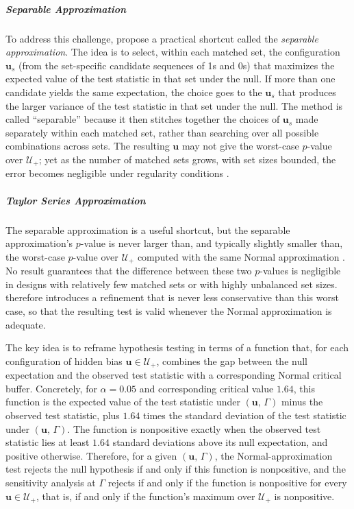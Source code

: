 \documentclass[
  12pt,
  leqno]{article}
\begin{document}
\subparagraph{Separable Approximation}\label{separable-approximation}

To address this challenge, \citet{gastwirthetal2000} propose a practical
shortcut called the \emph{separable approximation}. The idea is to
select, within each matched set, the configuration \(\bm{u}_s\) (from
the set-specific candidate sequences of 1s and 0s) that maximizes the
expected value of the test statistic in that set under the null. If more
than one candidate yields the same expectation, the choice goes to the
\(\bm{u}_s\) that produces the larger variance of the test statistic in
that set under the null. The method is called ``separable'' because it
then stitches together the choices of \(\bm{u}_s\) made separately
within each matched set, rather than searching over all possible
combinations across sets. The resulting \(\bm{u}\) may not give the
worst-case \(p\)-value over \(\mathcal{U}_{+}\); yet as the number of
matched sets grows, with set sizes bounded, the error becomes negligible
under regularity conditions \citep[Proposition 1]{gastwirthetal2000}.

\subparagraph{Taylor Series
Approximation}\label{taylor-series-approximation}

The separable approximation is a useful shortcut, but the separable
approximation's \(p\)-value is never larger than, and typically slightly
smaller than, the worst-case \(p\)-value over \(\mathcal{U}_{+}\)
computed with the same Normal approximation
\citep[pp.~2321--2322]{rosenbaum2018}. No result guarantees that the
difference between these two \(p\)-values is negligible in designs with
relatively few matched sets or with highly unbalanced set sizes.
\citet{rosenbaum2018} therefore introduces a refinement that is never
less conservative than this worst case, so that the resulting test is
valid whenever the Normal approximation is adequate.

The key idea is to reframe hypothesis testing in terms of a function
that, for each configuration of hidden bias
\(\bm{u} \in \mathcal{U}_{+}\), combines the gap between the null
expectation and the observed test statistic with a corresponding Normal
critical buffer. Concretely, for \(\alpha = 0.05\) and corresponding
critical value \(1.64\), this function is the expected value of the test
statistic under \((\bm{u}, \, \Gamma)\) minus the observed test
statistic, plus \(1.64\) times the standard deviation of the test
statistic under \((\bm{u}, \, \Gamma)\). The function is nonpositive
exactly when the observed test statistic lies at least \(1.64\) standard
deviations above its null expectation, and positive otherwise.
Therefore, for a given \((\bm{u}, \, \Gamma )\), the
Normal-approximation test rejects the null hypothesis if and only if
this function is nonpositive, and the sensitivity analysis at \(\Gamma\)
rejects if and only if the function is nonpositive for every
\(\bm{u} \in \mathcal{U}_{+}\), that is, if and only if the function's
maximum over \(\mathcal{U}_{+}\) is nonpositive.
\end{document}
